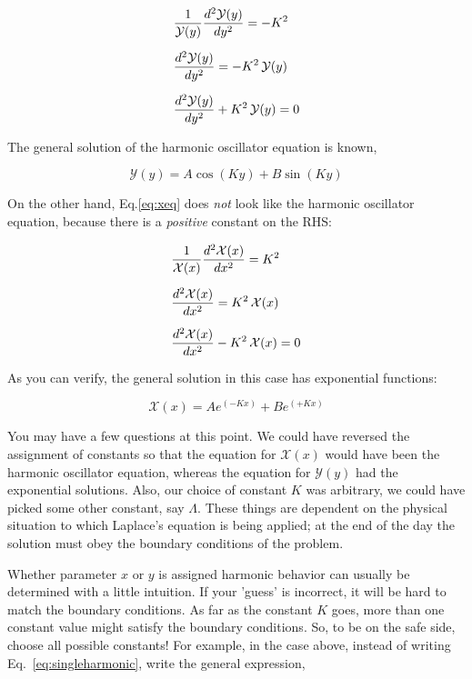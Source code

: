 \documentclass[12pt]{article}
\begin{document}
\begin{flushleft}
\begin{align}
& \frac{1}{ \mathcal{Y}(y) }\frac{d^{2} \mathcal{Y}(y)}{dy^{2}} = -K^{2} \notag \\[6pt]
& \frac{d^{2} \mathcal{Y}(y)}{dy^{2}} = -K^{2} \,\mathcal{Y}(y) \notag \\[6pt]
& \frac{d^{2} \mathcal{Y}(y)}{dy^{2}} + K^{2} \,\mathcal{Y}(y) \notag = 0
\end{align}

The general solution of the harmonic oscillator equation is known,

\begin{equation}
\mathcal{Y}(y) = A \cos{(Ky)} + B \sin{(Ky)}
\label{eq:singleharmonic}
\end{equation}

On the other hand, Eq.\ref{eq:xeq} does \textit{not} look like the harmonic oscillator equation, because there is a \textit{positive} constant on the RHS:

\begin{align}
& \frac{1}{ \mathcal{X}(x) }\frac{d^{2} \mathcal{X}(x)}{dx^{2}} = K^{2} \notag \\[6pt]
& \frac{d^{2} \mathcal{X}(x)}{dx^{2}} = K^{2} \,\mathcal{X}(x) \notag \\[6pt]
& \frac{d^{2} \mathcal{X}(x)}{dx^{2}} - K^{2} \,\mathcal{X}(x) \notag = 0
\end{align}

As you can verify, the general solution in this case has exponential functions:

\begin{equation}
\mathcal{X}(x) = A e^{(-Kx)} + B e^{(+Kx)}
\label{eq:singleexp}
\end{equation}

You may have a few questions at this point.  We could have reversed the assignment of constants so that the equation for $\mathcal{X}(x)$ would have been the harmonic oscillator equation, whereas the equation for $\mathcal{Y}(y)$ had the exponential solutions.  Also, our choice of constant $K$ was arbitrary, we could have picked some other constant, say $\Lambda$.  These things are dependent on the physical situation to which  Laplace's equation is being applied; at the end of the day the solution must obey the boundary conditions of the problem.

Whether parameter $x$ or $y$ is assigned harmonic behavior can usually be determined with a little intuition.  If your 'guess' is incorrect, it will be hard to match the boundary conditions.  As far as the constant $K$ goes, more than one constant value might satisfy the boundary conditions.  So, to be on the safe side, choose all possible constants!  For example, in the case above, instead of writing Eq.~\ref{eq:singleharmonic}, write the general expression,


\end{flushleft}
\end{document}
